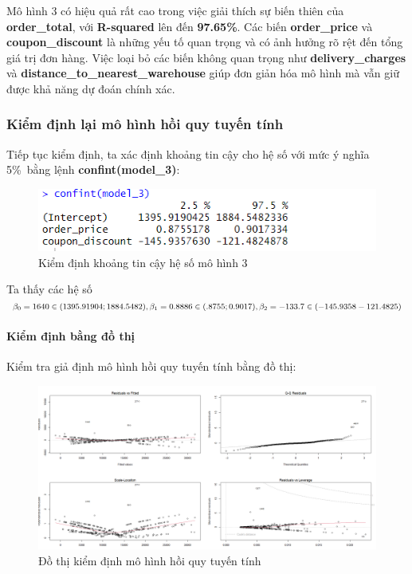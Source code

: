 Mô hình 3 có hiệu quả rất cao trong việc giải thích sự biến thiên của \textbf{order\_total}, với \textbf{R-squared} lên đến \textbf{97.65\%}. Các biến \textbf{order\_price} và \textbf{coupon\_discount} là những yếu tố quan trọng và có ảnh hưởng rõ rệt đến tổng giá trị đơn hàng. Việc loại bỏ các biến không quan trọng như \textbf{delivery\_charges} và \textbf{distance\_to\_nearest\_warehouse} giúp đơn giản hóa mô hình mà vẫn giữ được khả năng dự đoán chính xác.

\subsubsection{Kiểm định lại mô hình hồi quy tuyến tính}
Tiếp tục kiểm định, ta xác định khoảng tin cậy cho hệ số với mức ý nghĩa 5\%\ bằng lệnh \textbf{confint(model\_3)}:
\begin{figure}[!htp]
  \centering
  \includegraphics[width=0.7\linewidth]{graphics/5.5.5.png}
  \caption{Kiểm định khoảng tin cậy hệ số mô hình 3 }
\end{figure}

Ta thấy các hệ số $\beta_0= 1640\in(1395.91904; 1884.5482), \beta_1= 0.8886\in(.8755;0.9017),\\ \beta_2= -133.7\in(-145.9358 -121.4825)$
\paragraph{Kiểm định bằng đồ thị}

Kiểm tra giả định mô hình hồi quy tuyến tính bằng đồ thị:

\begin{figure}[!htp]
  \centering
  \includegraphics[width=0.7\linewidth]{graphics/5.5.6.png}
  \caption{Đồ thị kiểm định mô hình hồi quy  tuyến tính }
\end{figure}


